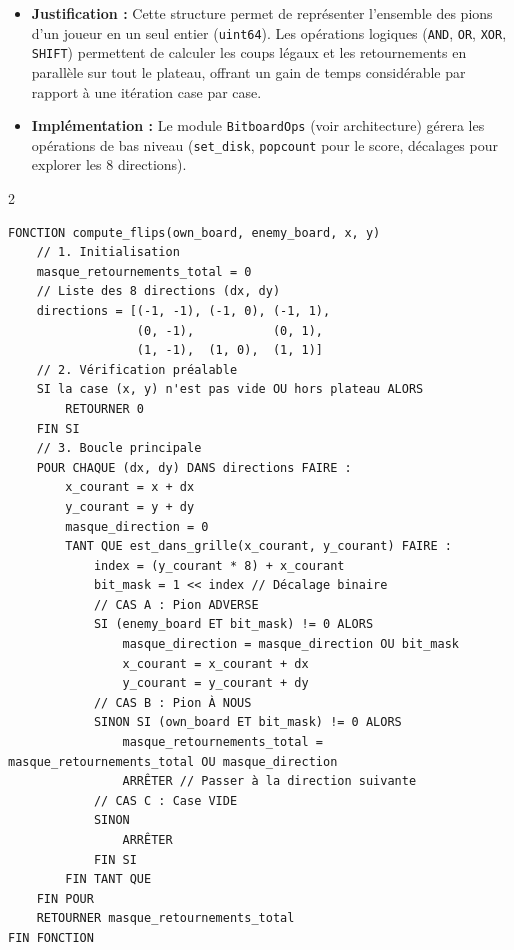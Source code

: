 \documentclass[a4paper]{article}
\begin{document}
\begin{itemize}
    \item \textbf{Justification :} Cette structure permet de représenter l'ensemble des pions d'un joueur en un seul entier \cite{Browne2014} (\texttt{uint64}). Les opérations logiques (\texttt{AND}, \texttt{OR}, \texttt{XOR}, \texttt{SHIFT}) permettent de calculer les coups légaux et les retournements en parallèle sur tout le plateau, offrant un gain de temps considérable par rapport à une itération case par case.
    \item \textbf{Implémentation :} Le module \texttt{BitboardOps} (voir architecture) gérera les opérations de bas niveau (\texttt{set\_disk}, \texttt{popcount} pour le score, décalages pour explorer les 8 directions).
\end{itemize}
\begin{multicols}{2}
\begin{lstlisting}[title=Algorithme de retournement,
    numbers=none,
    xleftmargin=0pt,
    breaklines=true
]
FONCTION compute_flips(own_board, enemy_board, x, y)
    // 1. Initialisation
    masque_retournements_total = 0
    // Liste des 8 directions (dx, dy)
    directions = [(-1, -1), (-1, 0), (-1, 1), 
                  (0, -1),           (0, 1), 
                  (1, -1),  (1, 0),  (1, 1)]
    // 2. Vérification préalable
    SI la case (x, y) n'est pas vide OU hors plateau ALORS
        RETOURNER 0
    FIN SI
    // 3. Boucle principale
    POUR CHAQUE (dx, dy) DANS directions FAIRE :
        x_courant = x + dx
        y_courant = y + dy
        masque_direction = 0  
        TANT QUE est_dans_grille(x_courant, y_courant) FAIRE :
            index = (y_courant * 8) + x_courant
            bit_mask = 1 << index // Décalage binaire
            // CAS A : Pion ADVERSE
            SI (enemy_board ET bit_mask) != 0 ALORS
                masque_direction = masque_direction OU bit_mask
                x_courant = x_courant + dx
                y_courant = y_courant + dy
            // CAS B : Pion À NOUS
            SINON SI (own_board ET bit_mask) != 0 ALORS
                masque_retournements_total = masque_retournements_total OU masque_direction
                ARRÊTER // Passer à la direction suivante
            // CAS C : Case VIDE
            SINON
                ARRÊTER 
            FIN SI 
        FIN TANT QUE
    FIN POUR
    RETOURNER masque_retournements_total
FIN FONCTION
\end{lstlisting}
\end{multicols}
\end{document}
